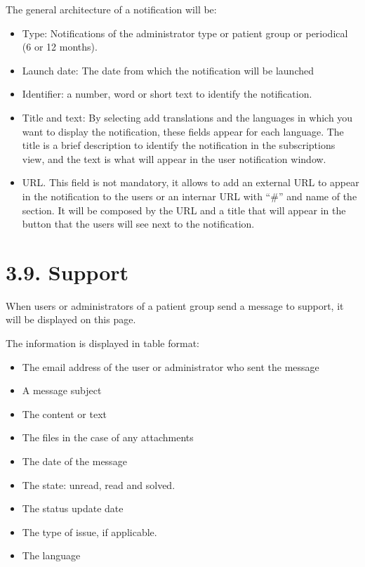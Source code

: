 \documentclass[letterpaper,10pt,english]{sphinxmanual}
\begin{document}
The general architecture of a notification will be:
\begin{itemize}
\item {} 
Type: Notifications of the administrator type or patient group or periodical (6 or 12 months).

\item {} 
Launch date: The date from which the notification will be launched

\item {} 
Identifier: a number, word or short text to identify the notification.

\item {} 
Title and text: By selecting add translations and the languages in which you want to display the notification, these fields appear for each language. The title is a brief description to identify the notification in the subscriptions view, and the text is what will appear in the user notification window.

\item {} 
URL. This field is not mandatory, it allows to add an external URL to appear in the notification to the users or an internar URL with “\#” and name of the section. It will be composed by the URL and a title that will appear in the button that the users will see next to the notification.

\end{itemize}


\section{3.9. Support}
\label{\detokenize{pages/Superadmin profile:support}}
When users or administrators of a patient group send a message to support, it will be displayed on this page.



The information is displayed in table format:
\begin{itemize}
\item {} 
The email address of the user or administrator who sent the message

\item {} 
A message subject

\item {} 
The content or text

\item {} 
The files in the case of any attachments

\item {} 
The date of the message

\item {} 
The state: unread, read and solved.

\item {} 
The status update date

\item {} 
The type of issue, if applicable.

\item {} 
The language

\end{itemize}
\end{document}
